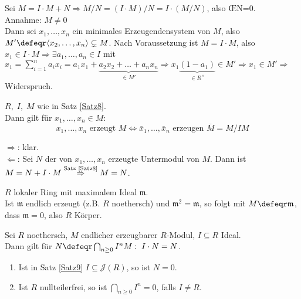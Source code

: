 \begin{Bew}
  Sei $M=I \cdot M + N \Rightarrow M/N = (I \cdot M)/N = I \cdot (M/N)$, also \OE N=0.\\
  Annahme: $M \not= 0$\\
  Dann sei $x_1, \dots, x_n$ ein minimales Erzeugendensystem von $M$, also $M' \defeqr \langle x_2, \dots, x_n\rangle \subsetneq M$.
  Nach Voraussetzung ist $M = I \cdot M$, also $x_1 \in I \cdot M \Rightarrow
  \exists a_1, \dots, a_n \in I$ mit $x_1 = \sum_{i=1}^n a_i x_i = a_1 x_1 +
  \underset{\in M'}{\underbrace{a_2 x_2 + \dots + a_n x_n}} \Rightarrow
  x_1\underset{\in R^{\times}}{\underbrace{(1-a_1)}} \in M' \Rightarrow x_1 \in
  M' \Rightarrow$ Widerspruch.
\end{Bew}

\begin{Folg}
\label{2.21}
  $R, \; I, \; M$ wie in Satz  \ref{Satz8}.\\
  Dann gilt für $x_1, \dots, x_n \in M$:
  \[ x_1, \dots, x_n \text{ erzeugt } M \Leftrightarrow \bar{x}_1, \dots, \bar{x}_n \text{ erzeugen } \overline{M} = M/IM\]
\end{Folg}

\begin{Bew}
  \glqq$\Rightarrow$\grqq: klar.\\
  \glqq$\Leftarrow$\grqq: Sei $N$ der von $x_1, \dots, x_n$ erzeugte Untermodul von $M$. Dann ist $M = N + I \cdot M \overset{\text{\scriptsize Satz \ref{Satz8}}}{\Rightarrow} M = N$.
\end{Bew}

\begin{nnBsp}
  $R$ lokaler Ring mit maximalem Ideal $\mathfrak{m}$.\\
  Ist $\mathfrak{m}$ endlich erzeugt (z.B. $R$ noethersch) und $\mathfrak{m}^2 =
  \mathfrak{m}$, so folgt mit $M\defeqr\mathfrak{m}$, dass $\mathfrak{m}=0$,
  also $R$ Körper. 
\end{nnBsp}

\begin{Satz}
\label{Satz9}
  Sei $R$ noethersch, $M$ endlicher erzeugbarer $R$-Modul, $I \subseteq R$ Ideal.\\
  Dann gilt für $N \defeqr \bigcap_{n \geq 0} I^n M: \; I \cdot N = N$.
\end{Satz}

\begin{Folg}
\label{2.22}
  \begin{enumerate}
    \item \label{2.22a} Ist in Satz \ref{Satz9} $I \subseteq \mathcal{J}(R)$, so ist $N = 0$.
    \item Ist $R$ nullteilerfrei, so ist $\bigcap_{n \geq 0} I^n = 0$, falls $I \neq R$.
  \end{enumerate}
\end{Folg}

